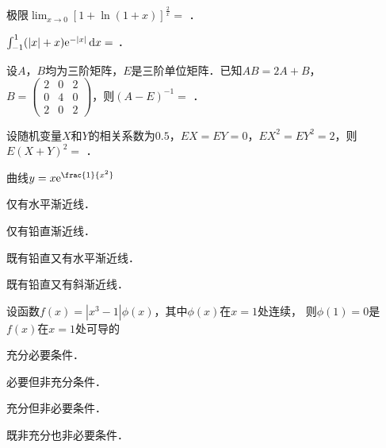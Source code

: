 \documentclass[plain,noanswer,medmath]{../../template/jnuexam}
\begin{document}






\begin{problem}
极限$\lim_{x \to 0} [1 + \ln(1 + x)]^{\frac{2}{x}} =$ \fillin{}．
\end{problem}


\begin{problem}
$\int_{-1}^1 (|x| + x) \mathrm{e}^{- |x|} \mathop{}\!\mathrm{d} x =$ \fillin{}．
\end{problem}




\begin{problem}
设$A$，$B$均为三阶矩阵，$E$是三阶单位矩阵．已知$AB = 2A + B$，$B = \begin{pmatrix}
  2 & 0 & 2 \\
  0 & 4 & 0 \\
  2 & 0 & 2
\end{pmatrix}$，则$(A - E)^{-1} =$ \fillin{}．
\end{problem}




\begin{problem}
设随机变量$X$和$Y$的相关系数为$0.5$，$EX = EY = 0$，$EX^2 = EY^2 = 2$，则$E(X + Y)^2 =$ \fillin{}．
\end{problem}




\begin{problem}
曲线$y = x\e^{\frac{1}{x^2}}$\pickout{}
\begin{abcd}
\item 仅有水平渐近线．
\item 仅有铅直渐近线．
\item 既有铅直又有水平渐近线．
\item 既有铅直又有斜渐近线．
\end{abcd}
\end{problem}


\begin{problem}
设函数$f(x) = \left| x^3 - 1 \right|\phi(x)$，其中$\phi (x)$在$x = 1$处连续，
则$\phi (1) = 0$是$f(x)$在$x = 1$处可导的\pickout{}
\begin{abcd}
\item 充分必要条件．
\item 必要但非充分条件．
\item 充分但非必要条件．
\item 既非充分也非必要条件．
\end{abcd}
\end{problem}
\end{document}

